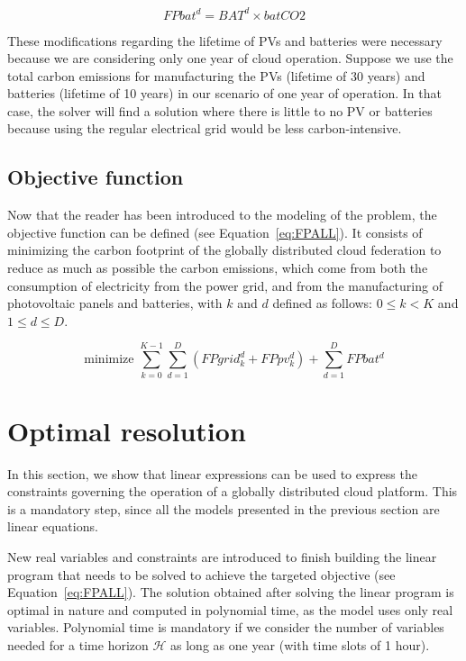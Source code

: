 \begin{equation} \label{eq:fbat}
   FPbat^d =  BAT^d \times batCO2
\end{equation}


These modifications regarding the lifetime of PVs and batteries were necessary because we are considering only one year of cloud operation. Suppose we use the total carbon emissions for manufacturing the PVs (lifetime of 30 years) and batteries (lifetime of 10 years) in our scenario of one year of operation. In that case, the solver will find a solution where there is little to no PV or batteries because using the regular electrical grid would be less carbon-intensive.


\subsection{Objective function}
\label{sec:objectivefunction_ccgrid}

Now that the reader has been introduced to the modeling of the problem, the objective function can be defined (see Equation~\eqref{eq:FPALL}). It consists of minimizing the carbon footprint of the globally distributed cloud federation to reduce as much as possible the carbon emissions, which come from both the consumption of electricity from the power grid, and from the manufacturing of photovoltaic panels and batteries, with $k$ and $d$ defined as follows: $0\leq k< K$ and $1\leq d\leq D$.

\begin{equation} \label{eq:FPALL}
\text{minimize }\sum_{k=0}^{K-1} \sum_{d=1}^D ( FPgrid^d_k +  FPpv^d_k) + \sum_{d=1}^D FPbat^d
\end{equation}


\section{Optimal resolution}
\label{sec:optimalresolution_ccgrid}


In this section, we show that linear expressions can be used to express the constraints governing the operation of a globally distributed cloud platform. This is a mandatory step, since all the models presented in the previous section are linear equations. 

New real variables and constraints are introduced to finish building the linear program that needs to be solved to achieve the targeted objective (see Equation~\eqref{eq:FPALL}). The solution obtained after solving the linear program is optimal in nature and computed in polynomial time, as the model uses only real variables. Polynomial time is mandatory if we consider the number of variables needed for a time horizon $\mathcal{H}$ as long as one year (with time slots of 1 hour). 

